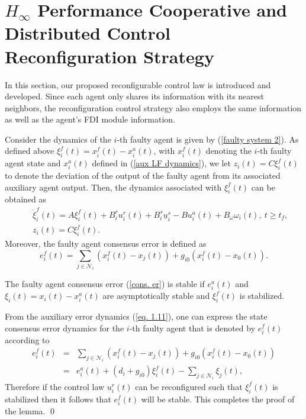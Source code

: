 \documentclass[12pt,draftcls,onecolumn]{IEEEtran}
\begin{document}
\section{$H_{\infty}$ Performance Cooperative and Distributed  Control Reconfiguration Strategy}\label{proposed methodology}
In this section, our proposed  reconfigurable control law is introduced and developed.  Since each agent only shares its information with its nearest neighbors,  the reconfiguration control strategy also employs the same information as well as the agent's FDI module information. \par
Consider the dynamics of the $i$-th faulty agent is given by (\ref{faulty system 2}). As defined above  $\xi_i^f(t)=x_i^f(t)-x_i^a(t)$,  with $x_i^f(t)$ denoting the $i$-th faulty agent  state and $x_i^a(t)$  defined in (\ref{aux LF dynamics}),  we let $z_i(t)=C\xi_i^f(t)$ to  denote the deviation of the output of the faulty agent from its associated auxiliary agent output. Then, the dynamics associated with $\xi_i^f(t)$ can be obtained as
\begin{eqnarray}
&&\dot \xi_i^f(t)=A \xi_i^f(t)+B_i^r u_i^r(t)+B_i^s\underline u_i^s-Bu_i^a(t)+B_{\omega}\omega_i(t),\ t\geq t_f, \nonumber \\ 
&&z_i(t)=C\xi_i^f(t).\label{eq. 1.11}
\end{eqnarray}
Moreover, the faulty agent consensus error is defined as 
\begin{equation}
e_i^f(t)=\sum_{j\in\mathcal{N}_i}(x_i^f(t)-x_j(t))+g_{i0}(x_i^f(t)-x_0(t)).\label{cons. er}
\end{equation}
\begin{lemmas}\label{Lemma 1}
The faulty agent consensus error (\ref{cons. er}) is stable 
if $e_i^a(t)$ and $\xi_i(t)=x_i(t)-x_i^a(t)$ are asymptotically stable and $\xi_i^f(t)$ is stabilized.
\end{lemmas}
\proof
From the auxiliary error dynamics  (\ref{eq. 1.11}), one can express the state consensus error dynamics for the $i$-th faulty agent that is denoted by $e_i^f(t)$ according to
\begin{eqnarray*}
e_i^f(t)&=&\sum_{j\in \mathcal{N}_i}(x_i^f(t)-x_j(t))+g_{i0}(x_i^f(t)-x_0(t))\\
&=&e_i^a(t)+(d_i+g_{i0})\xi_i^f(t)-\sum_{j\in \mathcal{N}_i}\xi_j(t),
\end{eqnarray*}
Therefore if the control law $u_i^r(t)$ can be reconfigured such that $\xi_i^f(t)$ is stabilized then it follows that $e_i^f(t)$ will be stable. This completes the proof of the lemma.   \qed
\par
\end{document}
